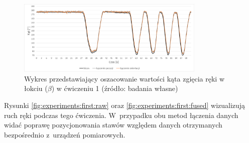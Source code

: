 	\begin{figure}[!htb]
		\centering
		\includegraphics[width=0.8\textwidth]{images/100/angle.png}
		\caption{Wykres przedstawiający oszacowanie wartości kąta zgięcia ręki w łokciu ($\beta$) w ćwiczeniu 1 (źródło: badania własne)}
		\label{fig:experiments:first:angle}
	\end{figure}
												
Rysunki \ref{fig:experiments:first:raw} oraz \ref{fig:experiments:first:fused} wizualizują ruch ręki podczas tego ćwiczenia. W~przypadku obu metod łączenia danych widać poprawę pozycjonowania stawów względem danych otrzymanych bezpośrednio z~urządzeń pomiarowych. 
					
